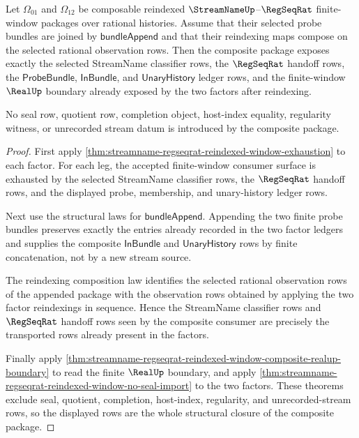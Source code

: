 \begin{theorem}
\label{thm:streamname-regseqrat-reindexed-window-structural-closure}
Let $\Omega_{01}$ and $\Omega_{12}$ be composable reindexed
$\StreamNameUp$--$\RegSeqRat$ finite-window packages over rational histories.
Assume that their selected probe bundles are joined by
$\mathsf{bundleAppend}$ and that their reindexing maps compose on the selected
rational observation rows. Then the composite package exposes exactly the
selected StreamName classifier rows, the $\RegSeqRat$ handoff rows, the
$\mathsf{ProbeBundle}$, $\mathsf{InBundle}$, and $\mathsf{UnaryHistory}$
ledger rows, and the finite-window $\RealUp$ boundary already exposed by the
two factors after reindexing.

No seal row, quotient row, completion object, host-index equality, regularity
witness, or unrecorded stream datum is introduced by the composite package.
\end{theorem}
\begin{proof}
First apply
\autoref{thm:streamname-regseqrat-reindexed-window-exhaustion} to each factor.
For each leg, the accepted finite-window consumer surface is exhausted by the
selected StreamName classifier rows, the $\RegSeqRat$ handoff rows, and the
displayed probe, membership, and unary-history ledger rows.

Next use the structural laws for $\mathsf{bundleAppend}$. Appending the two
finite probe bundles preserves exactly the entries already recorded in the two
factor ledgers and supplies the composite $\mathsf{InBundle}$ and
$\mathsf{UnaryHistory}$ rows by finite concatenation, not by a new stream
source.

The reindexing composition law identifies the selected rational observation
rows of the appended package with the observation rows obtained by applying the
two factor reindexings in sequence. Hence the StreamName classifier rows and
$\RegSeqRat$ handoff rows seen by the composite consumer are precisely the
transported rows already present in the factors.

Finally apply
\autoref{thm:streamname-regseqrat-reindexed-window-composite-realup-boundary}
to read the finite $\RealUp$ boundary, and apply
\autoref{thm:streamname-regseqrat-reindexed-window-no-seal-import} to the two
factors. These theorems exclude seal, quotient, completion, host-index,
regularity, and unrecorded-stream rows, so the displayed rows are the whole
structural closure of the composite package.
\end{proof}

